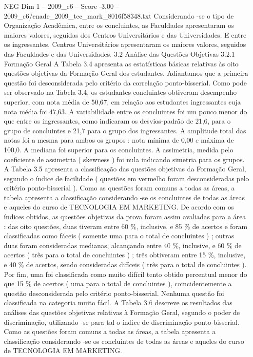 \begin{textsample}{NEG Dim 1 – 2009\_c6 – Score -3.00 – 2009\_c6/enade\_2009\_tec\_mark\_8016f58348.txt}
Considerando -se o tipo de Organização Acadêmica, entre os concluintes, as Faculdades apresentaram os maiores valores, seguidas dos Centros Universitários e das Universidades.
E entre os ingressantes, Centros Universitários apresentaram os maiores valores, seguidos das Faculdades e das Universidades. 3.2 Análise das Questões Objetivas 3.2.1 Formação Geral A Tabela 3.4 apresenta as estatísticas básicas relativas às oito questões objetivas da Formação Geral dos estudantes.
Adiantamos que a primeira questão foi desconsiderada pelo critério da correlação ponto-bisserial.
Como pode ser observado na Tabela 3.4, os estudantes concluintes obtiveram desempenho superior, com nota média de 50,67, em relação aos estudantes ingressantes cuja nota média foi 47,63.
A variabilidade entre os concluintes foi um pouco menor do que entre os ingressantes, como indicaram os desvios-padrão de 21,6, para o grupo de concluintes e 21,7 para o grupo dos ingressantes.
A amplitude total das notas foi a mesma para ambos os grupos : nota mínima de 0,00 e máxima de 100,0.
A mediana foi superior para os concluintes.
A assimetria, medida pelo coeficiente de assimetria ( skewness ) foi nula indicando simetria para os grupos.
A Tabela 3.5 apresenta a classificação das questões objetivas da Formação Geral, segundo o índice de facilidade ( questões em vermelho foram desconsideradas pelo critério ponto-bisserial ).
Como as questões foram comuns a todas as áreas, a tabela apresenta a classificação considerando -se os concluintes de todas as áreas e aqueles do curso de TECNOLOGIA EM MARKETING.
De acordo com os índices obtidos, as questões objetivas da prova foram assim avaliadas para a área : das oito questões, duas tiveram entre 60 \%, inclusive, e 85 \% de acertos e foram classificadas como fáceis ( somente uma para o total de concluintes ) ; outras duas foram consideradas medianas, alcançando entre 40 \%, inclusive, e 60 \% de acertos ( três para o total de concluintes ) ; três obtiveram entre 15 \%, inclusive, e 40 \% de acertos, sendo consideradas difíceis ( três para o total de concluintes ).
Por fim, uma foi classificada como muito difícil tento obtido percentual menor do que 15 \% de acertos ( uma para o total de concluintes ), coincidentemente a questão desconsiderada pelo critério ponto-bisserial.
Nenhuma questão foi classificada na categoria muito fácil.
A Tabela 3.6 descreve os resultados das análises das questões objetivas relativas à Formação Geral, segundo o poder de discriminação, utilizando -se para tal o índice de discriminação ponto-bisserial.
Como as questões foram comuns a todas as áreas, a tabela apresenta a classificação considerando -se os concluintes de todas as áreas e aqueles do curso de TECNOLOGIA EM MARKETING.

\end{textsample}

